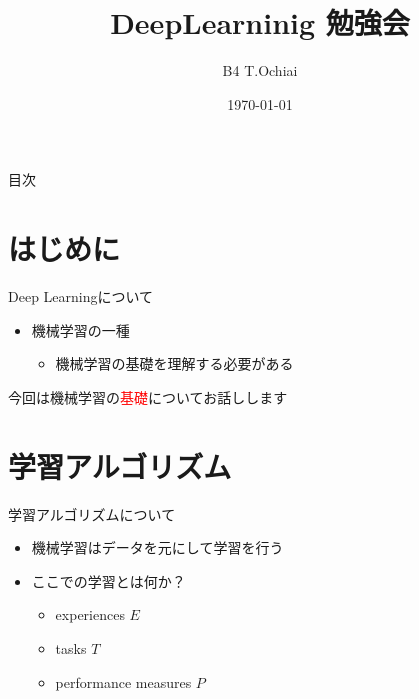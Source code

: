 \documentclass[dvipdfmx, 10pt]{beamer}
\title[]{DeepLearninig 勉強会}
\author[T.Ochiai]{B4 T.Ochiai}
\date[\today]{\today}
\institute[NIT]{Nagoya Institute of Technology \\ Takeuchi \& Karasuyama Lab}
\begin{document}

\begin{frame}[plain]
\titlepage
\end{frame}


\begin{frame}{目次}
\tableofcontents[hideallsubsections]
\end{frame}


\section{はじめに}


\begin{frame}{Deep Learningについて}
  \begin{itemize}
    \item 機械学習の一種
    \begin{itemize}
      \item 機械学習の基礎を理解する必要がある
    \end{itemize}
  \end{itemize}
  \centering 今回は機械学習の\textcolor{red}{基礎}についてお話しします
\end{frame}


\section{学習アルゴリズム}


\begin{frame}{学習アルゴリズムについて}
  \begin{itemize}
    \item 機械学習はデータを元にして学習を行う
    \item ここでの学習とは何か？
    \begin{itemize}
      \item experiences $E$
      \item tasks $T$
      \item performance measures $P$
    \end{itemize}
  \end{itemize}
\end{frame}

\end{document}

